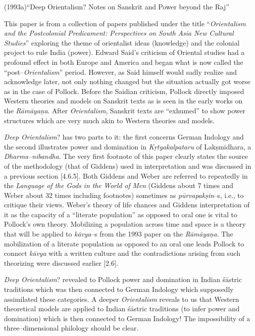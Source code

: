 (1993a)“Deep Orientalism? Notes on Sanskrit and Power beyond the Raj”

This paper is from a collection of papers published under the title “\textit{Orientalism and the Postcolonial Predicament: Perspectives on South Asia New Cultural Studies}” exploring the theme of orientalist ideas (knowledge) and the colonial project to rule India (power). Edward Said’s criticism of Oriental studies had a profound effect in both Europe and America and began what is now called the “post–\textit{Orientalism}” period. However, as Said himself would sadly realize and acknowledge later, not only nothing changed but the situation actually got worse as in the case of Pollock. Before the Saidian criticism, Pollock directly imposed Western theories and models on Sanskrit texts as is seen in the early works on the \textit{Rāmāyaṇa}. After \textit{Orientalism}, Sanskrit texts are “exhumed” to show power structures which are very much akin to Western theories and models.

\textit{Deep Orientalism}? has two parts to it: the first concerns German Indology and the second illustrates power and domination in \textit{Kṛtyakalpataru} of Lakṣmīdhara, a \textit{Dharma–nibandha}. The very first footnote of this paper clearly states the source of the methodology (that of Giddens) used in interpretation and was discussed in a previous section [4.6.5]. Both Giddens and Weber are referred to repeatedly in the \textit{Language of the Gods in the World of Men }(Giddens about 7 times and Weber about 32 times including footnotes) sometimes as \textit{pūrvapakṣin}–s, i.e., to critique their views. Weber’s theory of life chances and Giddens interpretation of it as the capacity of a “literate population” as opposed to oral one is vital to Pollock’s own theory. Mobilizing a population across time and space is a theory that will be applied to \textit{kāvya}–s from the 1993 paper on the\textit{ Rāmāyaṇa}. The mobilization of a literate population as opposed to an oral one leads Pollock to connect \textit{kāvya} with a written culture and the contradictions arising from such theorizing were discussed earlier [2.6].

\textit{Deep Orientalism}? revealed to Pollock power and domination in Indian śāstric traditions which was then connected to German Indology which supposedly assimilated these categories. A deeper\textit{ Orientalism} reveals to us that Western theoretical models are applied to Indian śāstric traditions (to infer power and domination) which is then connected to German Indology! The impossibility of a three–dimensional philology should be clear.

